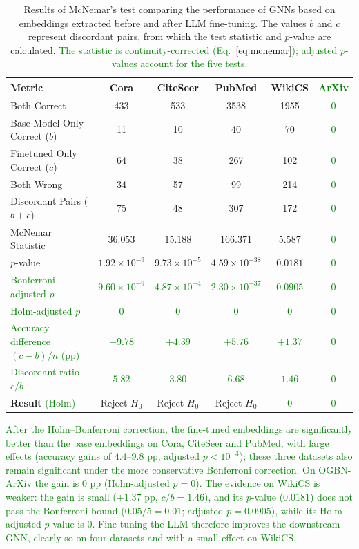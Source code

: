 \documentclass[a4paper,fleqn]{cas-sc}
\newcommand{\revthree}[1]{\textcolor{green}{#1}} %
\begin{document}
\begin{table}[h]
\caption{Results of McNemar's test comparing the performance of GNNs based on embeddings extracted before and after LLM fine-tuning. The values $b$ and $c$ represent discordant pairs, from which the test statistic and $p$-value are calculated. \revthree{The statistic is continuity-corrected (Eq.~\ref{eq:mcnemar}); adjusted $p$-values account for the five tests.}}
\label{tab:mcnemar}

\begin{tabular*}{\textwidth}{@{\extracolsep{\fill}} lccccc @{}}
\toprule
\textbf{Metric} & \textbf{Cora} & \textbf{CiteSeer} & \textbf{PubMed} & \textbf{WikiCS} & \revthree{\textbf{ArXiv}} \\
\midrule
Both Correct & 433 & 533 & 3538 & 1955 & \revthree{0} \\
Base Model Only Correct ($b$) & 11 & 10 & 40 & 70 & \revthree{0} \\
Finetuned Only Correct ($c$) & 64 & 38 & 267 & 102 & \revthree{0} \\
Both Wrong & 34 & 57 & 99 & 214 & \revthree{0} \\
Discordant Pairs ($b+c$) & 75 & 48 & 307 & 172 & \revthree{0} \\
McNemar Statistic & $36.053$ & $15.188$ & $166.371$ & $5.587$ & \revthree{0} \\
$p$-value & $1.92\times10^{-9}$ & $9.73\times10^{-5}$ & $4.59\times10^{-38}$ & $0.0181$ & \revthree{0} \\
\revthree{Bonferroni-adjusted $p$} & \revthree{$9.60\times10^{-9}$} & \revthree{$4.87\times10^{-4}$} & \revthree{$2.30\times10^{-37}$} & \revthree{$0.0905$} & \revthree{0} \\
\revthree{Holm-adjusted $p$} & \revthree{0} & \revthree{0} & \revthree{0} & \revthree{0} & \revthree{0} \\
\revthree{Accuracy difference $(c-b)/n$ (pp)} & \revthree{$+9.78$} & \revthree{$+4.39$} & \revthree{$+5.76$} & \revthree{$+1.37$} & \revthree{0} \\
\revthree{Discordant ratio $c/b$} & \revthree{$5.82$} & \revthree{$3.80$} & \revthree{$6.68$} & \revthree{$1.46$} & \revthree{0} \\
\midrule
\textbf{Result} \revthree{(Holm)} & Reject $H_0$ & Reject $H_0$ & Reject $H_0$ & \revthree{0} & \revthree{0} \\
\bottomrule
\end{tabular*}
\end{table}

\revthree{After the Holm--Bonferroni correction, the fine-tuned embeddings are significantly better than the base embeddings on Cora, CiteSeer and PubMed, with large effects (accuracy gains of $4.4$--$9.8$ pp, adjusted $p<10^{-3}$); these three datasets also remain significant under the more conservative Bonferroni correction. On OGBN-ArXiv the gain is $0$ pp (Holm-adjusted $p=0$). The evidence on WikiCS is weaker: the gain is small ($+1.37$ pp, $c/b=1.46$), and its $p$-value ($0.0181$) does not pass the Bonferroni bound ($0.05/5=0.01$; adjusted $p=0.0905$), while its Holm-adjusted $p$-value is $0$. Fine-tuning the LLM therefore improves the downstream GNN, clearly so on four datasets and with a small effect on WikiCS.}
\end{document}
